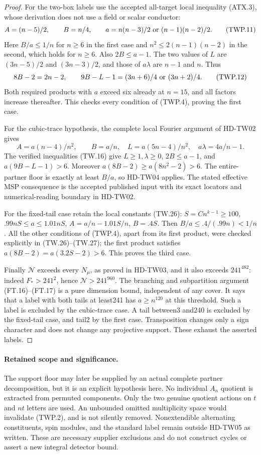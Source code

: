 \begin{proof}
For the two-box labels use the accepted all-target local inequality
(ATX.3), whose derivation does not use a field or scalar conductor:
\[
 A=(n-5)/2,\qquad B=n/4,\qquad
 a=n(n-3)/2\ \hbox{or}\ (n-1)(n-2)/2.
 \tag{TWP.11}
\]
Here \(B/a\le1/n\) for \(n\ge6\) in the first case and
\(n^2\le2(n-1)(n-2)\) in the second, which holds for \(n\ge6\).
Also \(2B\le a-1\). The two values of \(L\) are
\((3n-5)/2\) and \((3n-3)/2\), and those of \(a\lambda\)
are \(n-1\) and \(n\). Thus
\[
 8B-2=2n-2,\qquad
 9B-L-1=(3n+6)/4\ \hbox{or}\ (3n+2)/4.
 \tag{TWP.12}
\]
Both required products with \(a\) exceed six already at \(n=15\),
and all factors increase thereafter. This checks every condition of
(TWP.4), proving the first case.

For the cubic-trace hypothesis, the complete local Fourier argument
of HD-TW02 gives
\[
 A=a(n-4)/n^2,\qquad B=a/n,
 \quad L=a(5n-4)/n^2,\quad a\lambda=4a/n-1.
 \tag{TWP.13}
\]
The verified inequalities (TW.16) give \(L\ge1,\lambda\ge0\),
\(2B\le a-1\), and \(a(9B-L-1)>6\).
Moreover \(a(8B-2)\ge a(8n^2-2)>6\).
The entire-partner floor is exactly at least \(B/a\), so HD-TW04
applies. The stated effective MSP consequence is the accepted published
input with its exact locators and numerical-reading boundary in HD-TW02.

For the fixed-tail case retain the local constants (TW.26):
\(S=Cn^{k-1}\ge100\), \(.99nS\le a\le1.01nS\),
\(A=a/n-1.01S/n\), \(B=.4S\).
Then \(B/a\le .4/(.99n)<1/n\). All the other conditions of
(TWP.4), apart from its first product, were checked explicitly in
(TW.26)--(TW.27); the first product satisfies
\(a(8B-2)=a(3.2S-2)>6\). This proves the third case.

Finally \(\mathcal N\) exceeds every \(N_\mu\), as proved in
HD-TW03, and it also exceeds \(241^{482}\): indeed
\(F_*>241^2\), hence \(\mathcal N>241^{960}\).
The branching and subpartition argument (FT.16)--(FT.17) is a pure
dimension bound, independent of any cover. It says that a label with
both tails at least241 has \(a\ge n^{120}\) at this threshold.
Such a label is excluded by the cubic-trace case. A tail between3
and240 is excluded by the fixed-tail case, and tail2 by the first case.
Transposition changes only a sign character and does not change any
projective support. These exhaust the asserted labels.
\end{proof}

\paragraph{Retained scope and significance.}
The support floor may later be supplied by an actual complete
partner decomposition, but it is an explicit hypothesis here.
No individual \(A_n\) quotient is extracted from permuted components.
Only the two genuine quotient actions on \(t\) and \(nt\) letters
are used. An unbounded omitted multiplicity space would invalidate
(TWP.2), and is not silently removed. Nonextendible alternating
constituents, spin modules, and the standard label remain outside
HD-TW05 as written. These are necessary supplier exclusions and do
not construct cycles or assert a new integral detector bound.

